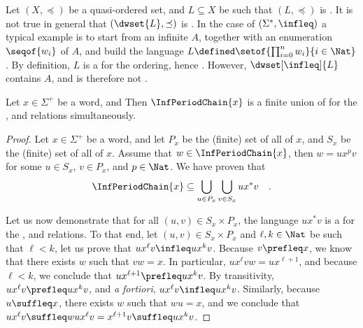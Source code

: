 \begin{remark}
    \label{dw-closure-not-wqo:rem}
    Let $(X,\preceq)$ be a quasi-ordered set, and $L \subseteq X$ be such that $(L,
    \preceq)$ is . It is not true in general that
    $(\dwset{L}, \preceq)$ is . In the case of $(\Sigma^*,
    \infleq)$ a typical example is to start from an infinite  $A$,
    together with an enumeration $\seqof{w_i}$ of $A$, and build the language $L
    \defined \setof{ \prod_{i = 0}^n w_i }{ i \in \Nat }$. By definition, $L$ is a
     for the  ordering, hence . However,
    $\dwset[\infleq]{L}$ contains $A$, and is therefore not
    . 
\end{remark}

\begin{lemma}
    \label{inf-period-chain:lem}
    Let $x \in \Sigma^+$ be a word, and
    Then $\InfPeriodChain{x}$ is a finite union of 
    for the ,  and  relations 
    simultaneously.
\end{lemma}
\begin{proof}
    Let $x \in \Sigma^+$ be a word, and let $P_x$ be the (finite) set 
    of all  of $x$, and $S_x$ be the (finite)
    set of all  of $x$.
    Assume that $w \in \InfPeriodChain{x}$, then $w = u x^p v$ for some
    $u \in S_x$, $v \in P_x$, and $p \in \Nat$.
    We have proven that
    \begin{equation*}
        \InfPeriodChain{x} \subseteq \bigcup_{u \in P_x} \bigcup_{v \in S_x} u x^* v
        \quad .
    \end{equation*}

    Let us now demonstrate that for all $(u,v) \in S_x \times P_x$, the
    language $u x^* v$ is a  for the ,  and  relations.
    To that end,
    let $(u,v) \in S_x \times P_x$ and $\ell, k \in \Nat$ be such that $\ell <
    k$, let us prove that $u x^\ell v \infleq u x^k  v$. Because $v \prefleq
    x$, we know that there exists $w$ such that $vw = x$. In particular,
    $ux^\ell vw = u x^{\ell + 1}$, and because $\ell < k$, we conclude that $u
    x^{\ell + 1} \prefleq u x^k v$. By transitivity, $u x^\ell v \prefleq u x^k
    v$, and \emph{a fortiori}, $u x^\ell v \infleq u x^k v$. 
    Similarly, because $u \suffleq x$,  there exists $w$ such that $wu  = x$, 
    and we conclude that $u x^{\ell} v \suffleq w u x^\ell v = x^{\ell + 1} v \suffleq u x^k v$.
    \qedhere
\end{proof}




